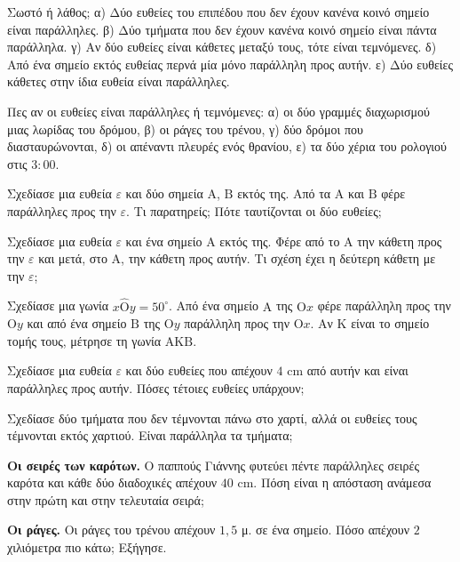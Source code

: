 

\ex Σωστό ή λάθος; α) Δύο ευθείες του επιπέδου που δεν έχουν κανένα κοινό σημείο είναι παράλληλες. \quad β) Δύο τμήματα που δεν έχουν κανένα κοινό σημείο είναι πάντα παράλληλα. \quad γ) Αν δύο ευθείες είναι κάθετες μεταξύ τους, τότε είναι τεμνόμενες. \quad δ) Από ένα σημείο εκτός ευθείας περνά μία μόνο παράλληλη προς αυτήν. \quad ε) Δύο ευθείες κάθετες στην ίδια ευθεία είναι παράλληλες.

\ex Πες αν οι ευθείες είναι παράλληλες ή τεμνόμενες: α) οι δύο γραμμές διαχωρισμού μιας λωρίδας του δρόμου, β) οι ράγες του τρένου, γ) δύο δρόμοι που διασταυρώνονται, δ) οι απέναντι πλευρές ενός θρανίου, ε) τα δύο χέρια του ρολογιού στις $3{:}00$.

\ex Σχεδίασε μια ευθεία $\varepsilon$ και δύο σημεία $\mathrm{Α}$, $\mathrm{Β}$ εκτός της. Από τα $\mathrm{Α}$ και $\mathrm{Β}$ φέρε παράλληλες προς την $\varepsilon$. Τι παρατηρείς; Πότε ταυτίζονται οι δύο ευθείες;

\ex Σχεδίασε μια ευθεία $\varepsilon$ και ένα σημείο $\mathrm{Α}$ εκτός της. Φέρε από το $\mathrm{Α}$ την κάθετη προς την $\varepsilon$ και μετά, στο $\mathrm{Α}$, την κάθετη προς αυτήν. Τι σχέση έχει η δεύτερη κάθετη με την $\varepsilon$;

\ex Σχεδίασε μια γωνία $x\hat{\mathrm{Ο}}y=50^\circ$. Από ένα σημείο $\mathrm{Α}$ της $\mathrm{Ο}x$ φέρε παράλληλη προς την $\mathrm{Ο}y$ και από ένα σημείο $\mathrm{Β}$ της $\mathrm{Ο}y$ παράλληλη προς την $\mathrm{Ο}x$. Αν $\mathrm{Κ}$ είναι το σημείο τομής τους, μέτρησε τη γωνία $\mathrm{ΑΚΒ}$.

\ex Σχεδίασε μια ευθεία $\varepsilon$ και δύο ευθείες που απέχουν $4$ cm από αυτήν και είναι παράλληλες προς αυτήν. Πόσες τέτοιες ευθείες υπάρχουν;

\ex Σχεδίασε δύο τμήματα που δεν τέμνονται πάνω στο χαρτί, αλλά οι ευθείες τους τέμνονται εκτός χαρτιού. Είναι παράλληλα τα τμήματα;


\ex \textbf{Οι σειρές των καρότων.} Ο παππούς Γιάννης φυτεύει πέντε παράλληλες σειρές καρότα και κάθε δύο διαδοχικές απέχουν $40$ cm. Πόση είναι η απόσταση ανάμεσα στην πρώτη και στην τελευταία σειρά;

\ex \textbf{Οι ράγες.} Οι ράγες του τρένου απέχουν $1{,}5$ μ. σε ένα σημείο. Πόσο απέχουν $2$ χιλιόμετρα πιο κάτω; Εξήγησε.

